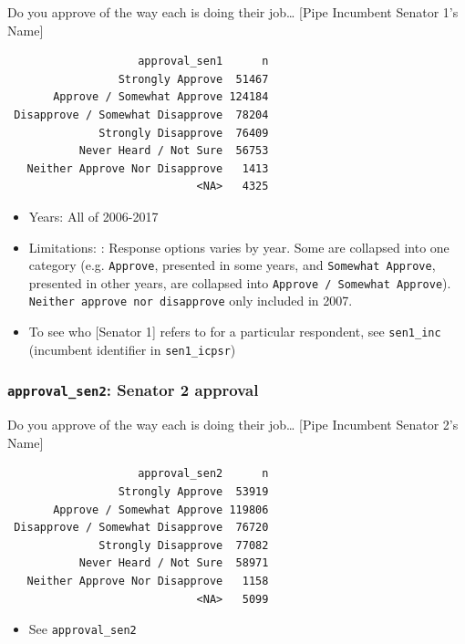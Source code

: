 \documentclass[10pt,article,oneside]{memoir}
\theoremstyle{definition}
\begin{document}
Do you approve of the way each is doing their job\ldots{} {[}Pipe
Incumbent Senator 1's Name{]}

\begin{verbatim}
                    approval_sen1      n
                 Strongly Approve  51467
       Approve / Somewhat Approve 124184
 Disapprove / Somewhat Disapprove  78204
              Strongly Disapprove  76409
           Never Heard / Not Sure  56753
   Neither Approve Nor Disapprove   1413
                             <NA>   4325
\end{verbatim}

\begin{itemize}
\tightlist
\item
  Years: All of 2006-2017
\item
  Limitations: : Response options varies by year. Some are collapsed
  into one category (e.g. \texttt{Approve}, presented in some years, and
  \texttt{Somewhat\ Approve}, presented in other years, are collapsed
  into \texttt{Approve\ /\ Somewhat\ Approve}).
  \texttt{Neither\ approve\ nor\ disapprove} only included in 2007.
\item
  To see who {[}Senator 1{]} refers to for a particular respondent, see
  \texttt{sen1\_inc} (incumbent identifier in \texttt{sen1\_icpsr})
\end{itemize}

\hypertarget{approval_sen2-senator-2-approval}{%
\subsubsection{\texorpdfstring{\texttt{approval\_sen2}: Senator 2
approval}{approval\_sen2: Senator 2 approval}}\label{approval_sen2-senator-2-approval}}

Do you approve of the way each is doing their job\ldots{} {[}Pipe
Incumbent Senator 2's Name{]}

\begin{verbatim}
                    approval_sen2      n
                 Strongly Approve  53919
       Approve / Somewhat Approve 119806
 Disapprove / Somewhat Disapprove  76720
              Strongly Disapprove  77082
           Never Heard / Not Sure  58971
   Neither Approve Nor Disapprove   1158
                             <NA>   5099
\end{verbatim}

\begin{itemize}
\tightlist
\item
  See \texttt{approval\_sen2}
\end{itemize}
\end{document}
